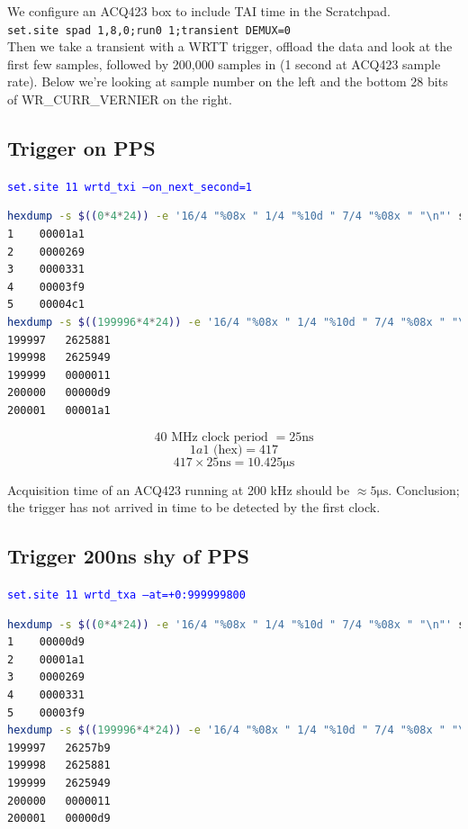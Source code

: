 \documentclass[]{article}
\begin{document}
We configure an ACQ423 box to include TAI time in the Scratchpad.\\
\texttt{set.site spad 1,8,0;run0 1;transient DEMUX=0}\\

Then we take a transient with a WRTT trigger, offload the data and look at the first few samples, followed by 200,000 samples in (1 second at ACQ423 sample rate). Below we're looking at sample number on the left and the bottom 28 bits of WR\_CURR\_VERNIER on the right.\\

\subsection{Trigger on PPS}

\textcolor{blue}{\texttt{set.site 11 wrtd\_txi --on\_next\_second=1}}

\begin{center}\begin{lstlisting}[language=bash,style=octavestyle]
hexdump -s $((0*4*24)) -e '16/4 "%08x " 1/4 "%10d " 7/4 "%08x " "\n"' shot_data | head -5 | awk '{ print $17,"\t",substr($19,2,16)}'
1 	 00001a1
2 	 0000269
3 	 0000331
4 	 00003f9
5 	 00004c1
hexdump -s $((199996*4*24)) -e '16/4 "%08x " 1/4 "%10d " 7/4 "%08x " "\n"' shot_data | head -5 | awk '{ print $17,"\t",substr($19,2,16)}'
199997 	 2625881
199998 	 2625949
199999 	 0000011
200000 	 00000d9
200001 	 00001a1
\end{lstlisting}\end{center}

\[	\textrm{40 MHz clock period }= 25\si{\ns}	\]
\[	1a1\textrm{ (hex)}= 417	\]
\[	417 \times 25 \si{\ns} = 10.425\si{\us}	\]

Acquisition time of an ACQ423 running at 200 kHz should be $\approx 5 \si{\us}$. Conclusion; the trigger has not arrived in time to be detected by the first clock.

\subsection{Trigger 200ns shy of PPS}

\textcolor{blue}{\texttt{set.site 11 wrtd\_txa --at=+0:999999800}}

\begin{center}\begin{lstlisting}[language=bash,style=octavestyle]
hexdump -s $((0*4*24)) -e '16/4 "%08x " 1/4 "%10d " 7/4 "%08x " "\n"' shot_data | head -5 | awk '{ print $17,"\t",substr($19,2,16)}'
1 	 00000d9
2 	 00001a1
3 	 0000269
4 	 0000331
5 	 00003f9
hexdump -s $((199996*4*24)) -e '16/4 "%08x " 1/4 "%10d " 7/4 "%08x " "\n"' shot_data | head -5 | awk '{ print $17,"\t",substr($19,2,16)}'
199997 	 26257b9
199998 	 2625881
199999 	 2625949
200000 	 0000011
200001 	 00000d9
\end{lstlisting}\end{center}
\end{document}
